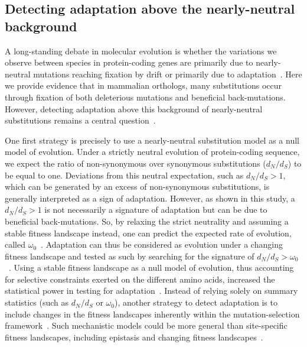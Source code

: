 \documentclass[12pt]{article}
\newcommand{\dn}{d_N}
\newcommand{\ds}{d_S}
\newcommand{\dnds}{\dn / \ds}
\begin{document}
\subsection*{Detecting adaptation above the nearly-neutral background}

A long-standing debate in molecular evolution is whether the variations we observe between species in protein-coding genes are primarily due to nearly-neutral mutations reaching fixation by drift or primarily due to adaptation~\cite{kimura_evolutionary_1968,jensen_importance_2019,gillespie_substitution_1994,Ohta1992}.
Here we provide evidence that in mammalian orthologs, many substitutions occur through fixation of both deleterious mutations and beneficial back-mutations.
However, detecting adaptation above this background of nearly-neutral substitutions remains a central question~\cite{kimura_evolutionary_1968,ohta_development_1996}.

One first strategy is precisely to use a nearly-neutral substitution model as a null model of evolution.
Under a strictly neutral evolution of protein-coding sequence, we expect the ratio of non-synonymous over synonymous substitutions ($\dnds$) to be equal to one.
Deviations from this neutral expectation, such as $\dnds > 1$, which can be generated by an excess of non-synonymous substitutions, is generally interpreted as a sign of adaptation.
However, as shown in this study, a $\dnds > 1$ is not necessarily a signature of adaptation but can be due to beneficial back-mutations.
So, by relaxing the strict neutrality and assuming a stable fitness landscape instead, one can predict the expected rate of evolution, called $\omega_0$~\cite{spielman_relationship_2015, dosreis_how_2015}.
Adaptation can thus be considered as evolution under a changing fitness landscape and tested as such by searching for the signature of $\dnds > \omega_0$~\cite{cvijovic_fate_2015, rodrigue_detecting_2017, rodrigue_bayesian_2021}.
Using a stable fitness landscape as a null model of evolution, thus accounting for selective constraints exerted on the different amino acids, increased the statistical power in testing for adaptation~\cite{latrille_genes_2023}.
Instead of relying solely on summary statistics (such as $\dnds$ or $\omega_0$), another strategy to detect adaptation is to include changes in the fitness landscapes inherently within the mutation-selection framework~\cite{tamuri_mutationselection_2021}.
Such mechanistic models could be more general than site-specific fitness landscapes, including epistasis and changing fitness landscapes~\cite{goldstein_sequence_2017, stolyarova_senescence_2020}.
\end{document}
